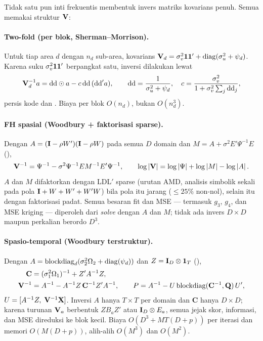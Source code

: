 Tidak satu pun inti frekuentis membentuk invers matriks kovarians penuh. Semua
memakai struktur $\mathbf{V}$:

\paragraph{Two-fold (per blok, Sherman--Morrison).}
Untuk tiap area $d$ dengan $n_d$ sub-area, kovarians
$\mathbf{V}_d=\sigma_v^2\mathbf{1}\mathbf{1}'+\mathrm{diag}(\sigma_u^2+\psi_d)$.
Karena suku $\sigma_v^2\mathbf{1}\mathbf{1}'$ berpangkat satu, inversi dilakukan lewat
\begin{equation}
  \mathbf{V}_d^{-1}a=\mathrm{dd}\odot a-c\,\mathrm{dd}\,(\mathrm{dd}'a),
  \qquad
  \mathrm{dd}=\frac{1}{\sigma_u^2+\psi_d},\quad
  c=\frac{\sigma_v^2}{1+\sigma_v^2\sum_j \mathrm{dd}_j},
  \label{eq:woodbury-tfh}
\end{equation}
persis kode  dan . Biaya per blok
$O(n_d)$, bukan $O(n_d^3)$.

\paragraph{FH spasial (Woodbury + faktorisasi sparse).}
Dengan $A=(\mathbf{I}-\rho W')(\mathbf{I}-\rho W)$ pada semua $D$ domain dan
$M=A+\sigma^2E'\Psi^{-1}E$ (),
\begin{equation}
  \mathbf{V}^{-1}=\Psi^{-1}-\sigma^2\Psi^{-1}EM^{-1}E'\Psi^{-1},\qquad
  \log\left|\mathbf{V}\right|=\log\left|\Psi\right|+\log\left|M\right|-\log\left|A\right|.
  \label{eq:woodbury-sfh}
\end{equation}
$A$ dan $M$ difaktorkan dengan LDL$'$ sparse  (urutan AMD,
analisis simbolik sekali pada pola $\mathbf{I}+W+W'+W'W$) bila pola itu jarang
($\le25\%$ non-nol), selain itu dengan faktorisasi padat. Semua besaran fit
dan MSE --- termasuk $g_3$, $g_4$, dan MSE kriging --- diperoleh dari
\emph{solve} dengan $A$ dan $M$; tidak ada invers $D\times D$ maupun perkalian
berordo $D^3$.

\paragraph{Spasio-temporal (Woodbury terstruktur).}
Dengan $A=\mathrm{blockdiag}_d(\sigma_2^2\Omega_2+\operatorname{diag}(\psi_d))$ dan
$Z=\mathbf{I}_D\otimes\mathbf 1_T$ (),
\begin{align}
  \mathbf C &= (\sigma_1^2\Omega_1)^{-1}+Z'A^{-1}Z,
    \label{eq:woodbury-c}\\
  \mathbf{V}^{-1} &= A^{-1}-A^{-1}Z\,\mathbf C^{-1}Z'A^{-1},\qquad
  P=A^{-1}-U\,\mathrm{blockdiag}(\mathbf C^{-1},\mathbf{Q})\,U',
    \label{eq:woodbury-v}
\end{align}
$U=[A^{-1}Z,\;\mathbf{V}^{-1}\mathbf{X}]$. Inversi $A$ hanya $T\times T$ per domain dan
$\mathbf C$ hanya $D\times D$; karena turunan $\mathbf{V}_a$ berbentuk $ZB_aZ'$ atau
$\mathbf{I}_D\otimes E_a$, semua jejak skor, informasi, dan MSE direduksi ke blok
kecil. Biaya $O(D^3+MT(D+p))$ per iterasi dan memori $O(M(D+p))$, alih-alih
$O(M^3)$ dan $O(M^2)$.

